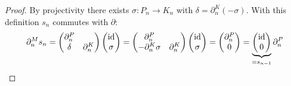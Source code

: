 \documentclass[fontsize=11pt,fleqn,a4paper]{scrartcl}
\begin{document}
\begin{proof}
By projectivity there exists $\sigma:P_n\to K_n$ with $\delta = \partial_n^K (-\sigma)$. With this definition $s_n$ commutes with $\partial$:
\[\partial_n^M s_n = \begin{pmatrix}\partial_n^P & \\ \delta & \partial_n^K\end{pmatrix}\begin{pmatrix}\operatorname{id}\\\sigma\end{pmatrix}= \begin{pmatrix}\partial_n^P & \\ -\partial_n^K \sigma & \partial_n^K\end{pmatrix}\begin{pmatrix}\operatorname{id}\\\sigma\end{pmatrix} = \begin{pmatrix}\partial_n^P \\ 0 \end{pmatrix} = \underbrace{\begin{pmatrix}\operatorname{id} \\ 0 \end{pmatrix}}_{=s_{n-1}}\partial_n^P \qedhere\]
\end{proof}
\end{document}
